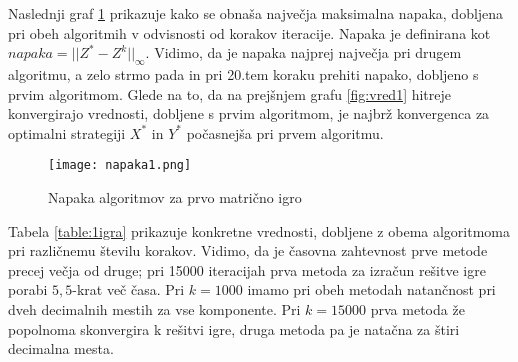 \documentclass[a4paper,12pt]{article}
\begin{document}
  Naslednji graf \ref{fig:napaka1} prikazuje kako se obnaša največja maksimalna napaka, dobljena pri obeh algoritmih v odvisnosti od korakov iteracije.
   Napaka je definirana kot $napaka = ||Z^* - Z^{k}||_{\infty}$. Vidimo, da je napaka najprej največja pri drugem algoritmu, a zelo strmo pada in pri 20.tem koraku prehiti napako, dobljeno 
   s prvim algoritmom. Glede na to, da na prejšnjem grafu \ref{fig:vred1} hitreje konvergirajo vrednosti, dobljene s prvim algoritmom, je najbrž konvergenca za optimalni strategiji $X^*$ in $Y^*$ počasnejša pri prvem algoritmu.
  
  \begin{figure}
    \centering
    \texttt{[image: napaka1.png]}
    \caption{Napaka algoritmov za prvo matrično igro}
    \label{fig:napaka1}
  \end{figure}

Tabela \ref{table:1igra} prikazuje konkretne vrednosti, dobljene z obema algoritmoma pri različnemu številu korakov.
Vidimo, da je časovna zahtevnost prve metode precej večja od druge; pri 15000 iteracijah prva metoda za izračun rešitve igre
porabi $5,5$-krat več časa. Pri $k = 1000$ imamo pri obeh metodah natančnost pri dveh decimalnih mestih za vse komponente. Pri $k = 15000$ prva metoda že popolnoma skonvergira
k rešitvi igre, druga metoda pa je natačna za štiri decimalna mesta.
\end{document}
